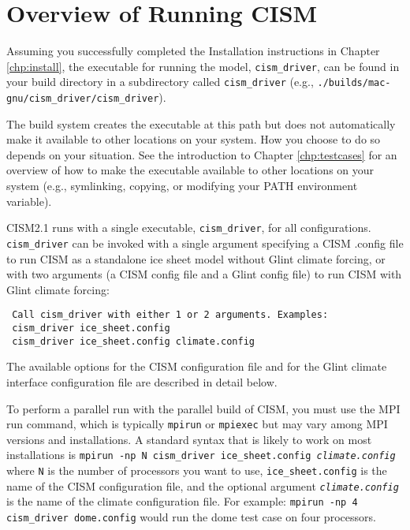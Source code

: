 \label{ch:runcism}

\section{Overview of Running CISM}

Assuming you successfully completed the Installation instructions in Chapter \ref{chp:install},
the executable for running the model, \texttt{cism\_driver}, can be found in your 
build directory in a subdirectory called \texttt{cism\_driver} 
(e.g., \texttt{./builds/mac-gnu/cism\_driver/cism\_driver}).

The build system creates the executable at this path but does not automatically
make it available to other locations on your system.  How you choose to do so depends 
on your situation.  See the introduction to Chapter \ref{chp:testcases} for 
an overview of how to make the executable available to other locations on your system
(e.g., symlinking, copying, or modifying your PATH environment variable).

CISM2.1 runs with a single executable, \texttt{cism\_driver},
for all configurations.
\texttt{cism\_driver} can be invoked with a single argument specifying 
a CISM .config file to run CISM as a standalone ice sheet model without Glint climate forcing,
or with two arguments (a CISM config file and a Glint config file) 
to run CISM with Glint climate forcing:
\begin{verbatim}
 Call cism_driver with either 1 or 2 arguments. Examples:
 cism_driver ice_sheet.config
 cism_driver ice_sheet.config climate.config
\end{verbatim}
The available options for the CISM configuration file and 
for the Glint climate interface configuration file are described in detail below.

To perform a parallel run with the parallel build of CISM, you must use the
MPI run command, which is typically \texttt{mpirun} or \texttt{mpiexec} but may 
vary among MPI versions and installations.  A standard syntax that is likely to
work on most installations is \newline
 \indent \texttt{mpirun -np N cism\_driver ice\_sheet.config \textit{climate.config}} \newline
where \texttt{N} is the number of processors you want to use, \texttt{ice\_sheet.config} is the name of the CISM
configuration file, and the optional argument \texttt{\textit{climate.config}} is the name 
of the climate configuration file.  For example: \newline
 \indent \texttt{mpirun -np 4 cism\_driver dome.config}\newline
would run the dome test case on four processors.

